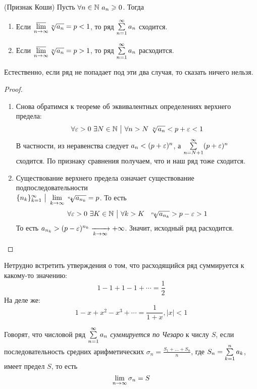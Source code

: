 \begin{theorem} (Признак Коши)
	Пусть $\forall n \in \mathbb{N}\ a_n \geqslant 0$. Тогда
	\begin{enumerate}
		\item Если $\varlimsup\limits_{n \to \infty} \sqrt[n]{a_n} = p < 1$, то ряд $\sum\limits_{n = 1}^\infty a_n$ сходится.
		
		\item Если $\varlimsup\limits_{n \to \infty} \sqrt[n]{a_n} = p > 1$, то ряд $\sum\limits_{n = 1}^\infty a_n$ расходится.
	\end{enumerate}
	Естественно, если ряд не попадает под эти два случая, то сказать ничего нельзя.
\end{theorem}

\begin{proof}~
	\begin{enumerate}
		\item Снова обратимся к теореме об эквивалентных определениях верхнего предела:
		\[
			\forall \varepsilon > 0\ \exists N \in \mathbb{N} \ \big|\  \forall n > N\ \sqrt[n]{a_n} < p + \varepsilon < 1
		\]
		В частности, из неравенства следует $a_n < (p + \varepsilon)^n$, а $\sum\limits_{n = N + 1}^\infty (p + \varepsilon)^n$ сходится. По признаку сравнения получаем, что и наш ряд тоже сходится.
		
		\item Существование верхнего предела означает существование подпоследовательности \\ $\{n_k\}_{k = 1}^\infty \ \big|\  \lim\limits_{k \to \infty} \sqrt[n_k]{a_{n_k}} = p$. То есть
		\[
			\forall \varepsilon > 0\ \exists K \in \mathbb{N} \ \big|\  \forall k > K\ \ \sqrt[n_k]{a_{n_k}} > p - \varepsilon > 1
		\]
		То есть $a_{n_k} > (p - \varepsilon)^{n_k} \xrightarrow[k \to \infty]{} +\infty$. Значит, исходный ряд расходится.
	\end{enumerate}
\end{proof}

\begin{example}
	Нетрудно встретить утверждения о том, что расходящийся ряд суммируется к какому-то значению:
	\[
		1 - 1 + 1 - 1 + \cdots = \frac{1}{2}
	\]
	На деле же:
	\[
		1 - x + x^2 - x^3 + \cdots = \frac{1}{1 + x}, |x| < 1
	\]
\end{example}

\begin{definition}
	Говорят, что числовой ряд $\sum\limits_{n = 1}^\infty a_n$ \textit{суммируется по Чезаро} к числу $S$, если последовательность средних арифметических $\sigma_n = \frac{S_1 + \ldots + S_n}{n}$, где $S_n = \sum\limits_{k = 1}^n a_k$, имеет предел $S$, то есть
	\[
		\lim\limits_{n \to \infty} \sigma_n = S
	\]
\end{definition}

